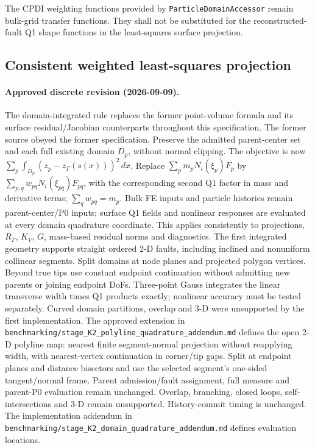\documentclass[11pt]{article}
\begin{document}
The CPDI weighting functions provided by \texttt{ParticleDomainAccessor} remain bulk-grid transfer functions.  They shall not be substituted for the reconstructed-fault Q1 shape functions in the least-squares surface projection.

\subsection{Consistent weighted least-squares projection}
\paragraph{Approved discrete revision (2026-09-09).}
The domain-integrated rule replaces the former point-volume formula
and its surface residual/Jacobian counterparts throughout this specification.
The former source obeyed the former specification. Preserve the admitted
parent-center set and each full existing domain $D_p$, without normal clipping.
The objective is now $\sum_p\int_{D_p}(z_p-z_\Gamma(s(x)))^2\,dx$.
Replace $\sum_p m_pN_i(\xi_p)F_p$ by
$\sum_{p,q}w_{pq}N_i(\xi_{pq})F_{pq}$, with the corresponding second Q1
factor in mass and derivative terms; $\sum_qw_{pq}=m_p$.
Bulk FE inputs and particle histories remain parent-center/P0 inputs;
surface Q1 fields and nonlinear responses are evaluated at every domain
quadrature coordinate. This applies consistently to projections, $R_\Gamma$,
$K_V$, $G$, mass-based residual norms and diagnostics.
The first integrated geometry supports straight ordered 2-D faults, including
inclined and nonuniform collinear segments. Split domains at node planes and
projected polygon vertices. Beyond true tips use constant endpoint continuation
without admitting new parents or joining endpoint DoFs. Three-point Gauss
integrates the linear transverse width times Q1 products exactly; nonlinear
accuracy must be tested separately. Curved domain partitions, overlap and 3-D
were unsupported by the first implementation. The approved extension in
\texttt{benchmarking/stage\_K2\_polyline\_quadrature\_addendum.md} defines
the open 2-D polyline map: nearest finite segment-normal projection without
reapplying width, with nearest-vertex continuation in corner/tip gaps. Split
at endpoint planes and distance bisectors and use the selected segment's
one-sided tangent/normal frame. Parent admission/fault assignment, full measure
and parent-P0 evaluation remain unchanged. Overlap, branching, closed loops,
self-intersections and 3-D remain unsupported. History-commit timing is unchanged. The implementation
addendum in \texttt{benchmarking/stage\_K2\_domain\_quadrature\_addendum.md}
defines evaluation locations.
\end{document}
